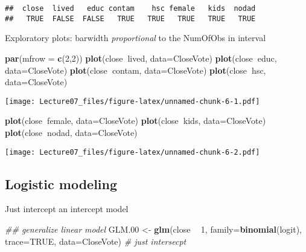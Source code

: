 \documentclass[
]{article}
\newenvironment{Shaded}{\begin{snugshade}}{\end{snugshade}}
\newcommand{\CommentTok}[1]{\textcolor[rgb]{0.56,0.35,0.01}{\textit{#1}}}
\newcommand{\DataTypeTok}[1]{\textcolor[rgb]{0.13,0.29,0.53}{#1}}
\newcommand{\DecValTok}[1]{\textcolor[rgb]{0.00,0.00,0.81}{#1}}
\newcommand{\FloatTok}[1]{\textcolor[rgb]{0.00,0.00,0.81}{#1}}
\newcommand{\KeywordTok}[1]{\textcolor[rgb]{0.13,0.29,0.53}{\textbf{#1}}}
\newcommand{\NormalTok}[1]{#1}
\newcommand{\OperatorTok}[1]{\textcolor[rgb]{0.81,0.36,0.00}{\textbf{#1}}}
\newcommand{\OtherTok}[1]{\textcolor[rgb]{0.56,0.35,0.01}{#1}}
\newcommand{\StringTok}[1]{\textcolor[rgb]{0.31,0.60,0.02}{#1}}
\begin{document}
\begin{verbatim}
##  close  lived   educ contam    hsc female   kids  nodad 
##   TRUE  FALSE  FALSE   TRUE   TRUE   TRUE   TRUE   TRUE
\end{verbatim}

Exploratory plots: barwidth \emph{proportional} to the NumOfObs in
interval

\begin{Shaded}
\begin{Highlighting}[]
\KeywordTok{par}\NormalTok{(}\DataTypeTok{mfrow =} \KeywordTok{c}\NormalTok{(}\DecValTok{2}\NormalTok{,}\DecValTok{2}\NormalTok{))}
\KeywordTok{plot}\NormalTok{(close}\OperatorTok{~}\NormalTok{lived, }\DataTypeTok{data=}\NormalTok{CloseVote)}
\KeywordTok{plot}\NormalTok{(close}\OperatorTok{~}\NormalTok{educ, }\DataTypeTok{data=}\NormalTok{CloseVote)}
\KeywordTok{plot}\NormalTok{(close}\OperatorTok{~}\NormalTok{contam, }\DataTypeTok{data=}\NormalTok{CloseVote)}
\KeywordTok{plot}\NormalTok{(close}\OperatorTok{~}\NormalTok{hsc, }\DataTypeTok{data=}\NormalTok{CloseVote)}
\end{Highlighting}
\end{Shaded}

\texttt{[image: Lecture07\_files/figure-latex/unnamed-chunk-6-1.pdf]}

\begin{Shaded}
\begin{Highlighting}[]
\KeywordTok{plot}\NormalTok{(close}\OperatorTok{~}\NormalTok{female, }\DataTypeTok{data=}\NormalTok{CloseVote)}
\KeywordTok{plot}\NormalTok{(close}\OperatorTok{~}\NormalTok{kids, }\DataTypeTok{data=}\NormalTok{CloseVote)}
\KeywordTok{plot}\NormalTok{(close}\OperatorTok{~}\NormalTok{nodad, }\DataTypeTok{data=}\NormalTok{CloseVote)}
\end{Highlighting}
\end{Shaded}

\texttt{[image: Lecture07\_files/figure-latex/unnamed-chunk-6-2.pdf]}

\hypertarget{logistic-modeling}{%
\subsection{Logistic modeling}\label{logistic-modeling}}

Just intercept an intercept model

\begin{Shaded}
\begin{Highlighting}[]
\CommentTok{## generalize linear model}
\NormalTok{GLM}\FloatTok{.00}\NormalTok{ <-}\StringTok{ }\KeywordTok{glm}\NormalTok{(close }\OperatorTok{~}\StringTok{ }\DecValTok{1}\NormalTok{, }\DataTypeTok{family=}\KeywordTok{binomial}\NormalTok{(logit), }\DataTypeTok{trace=}\OtherTok{TRUE}\NormalTok{, }\DataTypeTok{data=}\NormalTok{CloseVote) }\CommentTok{# just intersecpt}
\end{Highlighting}
\end{Shaded}
\end{document}
